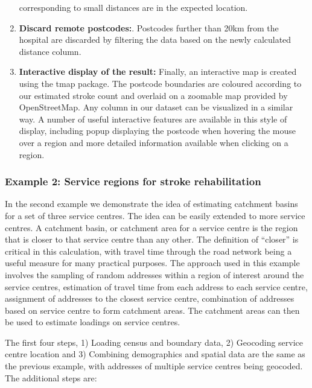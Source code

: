 \documentclass[utf8]{frontiersHLTH}
\begin{document}
\begin{enumerate}
  corresponding to small distances are in the expected location.
\item
  {\bf Discard remote postcodes:}. Postcodes further than 20km from the
  hospital are discarded by filtering the data based on the newly
  calculated distance column.
\item
  {\bf Interactive display of the result:} Finally, an interactive map is
  created using the tmap package. The postcode boundaries are coloured
  according to our estimated stroke count and overlaid on a zoomable map
  provided by OpenStreetMap. Any column in our dataset can be visualized
  in a similar way. A number of useful interactive features are
  available in this style of display, including popup displaying the
  postcode when hovering the mouse over a region and more detailed
  information available when clicking on a region.
\end{enumerate}

\subsubsection{Example 2: Service regions for stroke
rehabilitation}\label{example-2-service-regions-for-stroke-rehabilitation}

In the second example we demonstrate the idea of estimating catchment
basins for a set of three service centres. The idea can be easily
extended to more service centres. A catchment basin, or catchment area
for a service centre is the region that is closer to that service centre
than any other. The definition of ``closer'' is critical in this
calculation, with travel time through the road network being a useful
measure for many practical purposes. The approach used in this example
involves the sampling of random addresses within a region of interest
around the service centres, estimation of travel time from each address
to each service centre, assignment of addresses to the closest service
centre, combination of addresses based on service centre to form
catchment areas. The catchment areas can then be used to estimate
loadings on service centres.

The first four steps, 1) Loading census and boundary data, 2) Geocoding
service centre location and 3) Combining demographics and spatial data
are the same as the previous example, with addresses of multiple service
centres being geocoded. The additional steps are:
\end{document}
